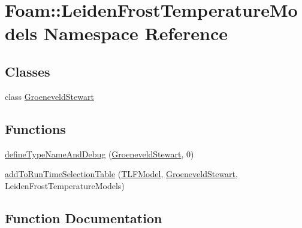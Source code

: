 \hypertarget{namespaceFoam_1_1LeidenFrostTemperatureModels}{}\section{Foam\+:\+:Leiden\+Frost\+Temperature\+Models Namespace Reference}
\label{namespaceFoam_1_1LeidenFrostTemperatureModels}
\subsection*{Classes}
\begin{DoxyCompactItemize}
\item 
class \hyperlink{classFoam_1_1LeidenFrostTemperatureModels_1_1GroeneveldStewart}{Groeneveld\+Stewart}
\end{DoxyCompactItemize}
\subsection*{Functions}
\begin{DoxyCompactItemize}
\item 
\hyperlink{namespaceFoam_1_1LeidenFrostTemperatureModels_a84992aa76dd8a9d5e051ff8f301105c5}{define\+Type\+Name\+And\+Debug} (\hyperlink{classFoam_1_1LeidenFrostTemperatureModels_1_1GroeneveldStewart}{Groeneveld\+Stewart}, 0)
\item 
\hyperlink{namespaceFoam_1_1LeidenFrostTemperatureModels_a998d7da77eb9239b6d5bce8abbc60b95}{add\+To\+Run\+Time\+Selection\+Table} (\hyperlink{classFoam_1_1TLFModel}{T\+L\+F\+Model}, \hyperlink{classFoam_1_1LeidenFrostTemperatureModels_1_1GroeneveldStewart}{Groeneveld\+Stewart}, Leiden\+Frost\+Temperature\+Models)
\end{DoxyCompactItemize}


\subsection{Function Documentation}
\mbox{\label{namespaceFoam_1_1LeidenFrostTemperatureModels_a84992aa76dd8a9d5e051ff8f301105c5}} 
